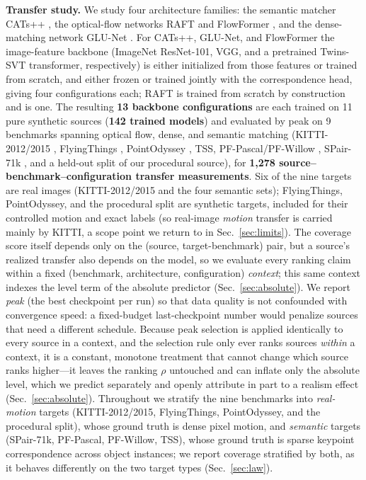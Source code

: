 \noindent\textbf{Transfer study.}
We study four architecture families: the semantic matcher CATs++
\cite{cho2022cats++}, the optical-flow networks RAFT \cite{teed2020raft} and
FlowFormer \cite{huang2022flowformer}, and the dense-matching network GLU-Net
\cite{truong2020glunet}. For CATs++, GLU-Net, and FlowFormer the image-feature
backbone (ImageNet ResNet-101, VGG, and a pretrained Twins-SVT transformer,
respectively) is either initialized from those features or trained from
scratch, and either frozen or trained jointly with the correspondence head,
giving four configurations each; RAFT is trained from scratch by construction
and is one. The resulting \textbf{13 backbone configurations} are each trained
on 11 pure synthetic sources (\textbf{142 trained models}) and evaluated by peak  on 9 benchmarks spanning
optical flow, dense, and semantic matching (KITTI-2012/2015 \cite{kitti_flow},
FlyingThings \cite{mayer2016FlyingThingsDataset}, PointOdyssey
\cite{pointodyssey}, TSS, PF-Pascal/PF-Willow \cite{pfpascal}, SPair-71k
\cite{spair71k}, and a held-out split of our procedural source), for
\textbf{1{,}278 source--benchmark--configuration transfer measurements}. Six of
the nine targets are real images (KITTI-2012/2015 and the four semantic sets);
FlyingThings, PointOdyssey, and the procedural split are synthetic targets,
included for their controlled motion and exact labels (so real-image \emph{motion}
transfer is carried mainly by KITTI, a scope point we return to in
Sec.~\ref{sec:limits}). The
coverage score itself depends only on the (source, target-benchmark) pair, but a
source's realized transfer also depends on the model, so we evaluate every ranking
claim within a fixed (benchmark, architecture, configuration) \emph{context}; this
same context indexes the level term of the absolute predictor (Sec.~\ref{sec:absolute}).
We report \emph{peak} \pck{} (the best checkpoint per run) so that data quality is
not confounded with convergence speed: a fixed-budget last-checkpoint number would
penalize sources that need a different schedule. Because peak selection is applied
identically to every source in a context, and the selection rule only ever ranks
sources \emph{within} a context, it is a constant, monotone treatment that cannot
change which source ranks higher---it leaves the ranking $\rho$ untouched and can
inflate only the absolute level, which we predict separately and openly attribute
in part to a realism effect (Sec.~\ref{sec:absolute}). Throughout we stratify the nine
benchmarks into \emph{real-motion} targets (KITTI-2012/2015, FlyingThings,
PointOdyssey, and the procedural split), whose ground truth is dense pixel
motion, and \emph{semantic} targets (SPair-71k, PF-Pascal, PF-Willow, TSS),
whose ground truth is sparse keypoint correspondence across object instances;
we report coverage stratified by both, as it behaves differently on the two
target types (Sec.~\ref{sec:law}).

